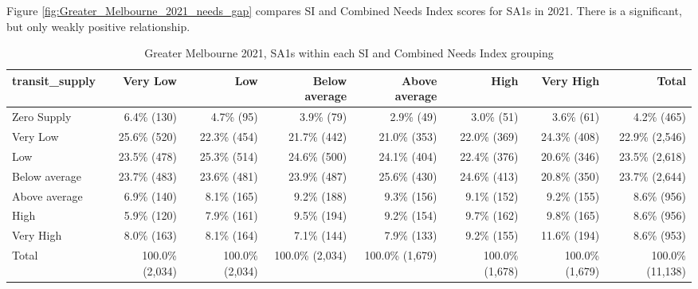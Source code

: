 \documentclass[preprint, 3p,
authoryear]{elsarticle} %
\begin{document}
Figure \ref{fig:Greater_Melbourne_2021_needs_gap} compares SI and
Combined Needs Index scores for SA1s in 2021. There is a significant,
but only weakly positive relationship.

\begin{table}

\caption{\label{tab:Greater_Melbourne_2021_needs_gap_zones}Greater Melbourne 2021, SA1s within each SI and Combined Needs Index grouping}
\centering
\fontsize{7}{9}\selectfont
\begin{tabular}[t]{l|r|r|r|r|r|r|r}
\hline
transit\_supply & Very Low & Low & Below average & Above average & High & Very High & Total\\
\hline
Zero Supply & 6.4\%   (130) & 4.7\%    (95) & 3.9\%    (79) & 2.9\%    (49) & 3.0\%    (51) & 3.6\%    (61) & 4.2\%    (465)\\
\hline
Very Low & 25.6\%   (520) & 22.3\%   (454) & 21.7\%   (442) & 21.0\%   (353) & 22.0\%   (369) & 24.3\%   (408) & 22.9\%  (2,546)\\
\hline
Low & 23.5\%   (478) & 25.3\%   (514) & 24.6\%   (500) & 24.1\%   (404) & 22.4\%   (376) & 20.6\%   (346) & 23.5\%  (2,618)\\
\hline
Below average & 23.7\%   (483) & 23.6\%   (481) & 23.9\%   (487) & 25.6\%   (430) & 24.6\%   (413) & 20.8\%   (350) & 23.7\%  (2,644)\\
\hline
Above average & 6.9\%   (140) & 8.1\%   (165) & 9.2\%   (188) & 9.3\%   (156) & 9.1\%   (152) & 9.2\%   (155) & 8.6\%    (956)\\
\hline
High & 5.9\%   (120) & 7.9\%   (161) & 9.5\%   (194) & 9.2\%   (154) & 9.7\%   (162) & 9.8\%   (165) & 8.6\%    (956)\\
\hline
Very High & 8.0\%   (163) & 8.1\%   (164) & 7.1\%   (144) & 7.9\%   (133) & 9.2\%   (155) & 11.6\%   (194) & 8.6\%    (953)\\
\hline
Total & 100.0\% (2,034) & 100.0\% (2,034) & 100.0\% (2,034) & 100.0\% (1,679) & 100.0\% (1,678) & 100.0\% (1,679) & 100.0\% (11,138)\\
\hline
\end{tabular}
\end{table}
\end{document}
